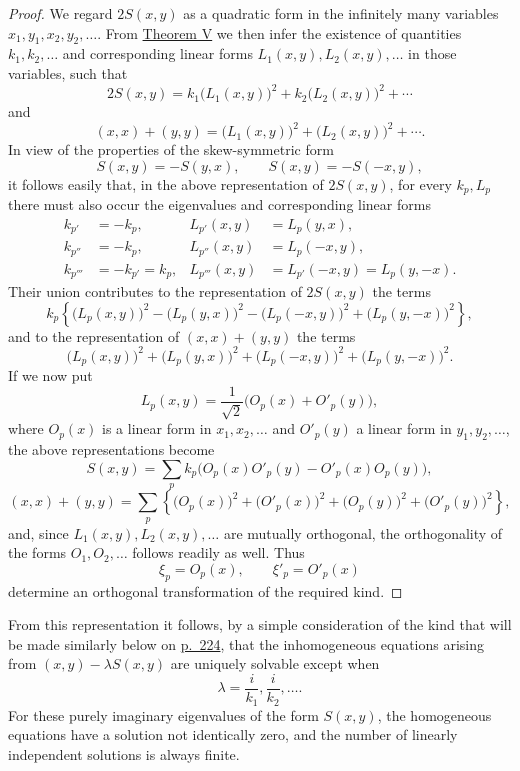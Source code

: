 \documentclass[b5paper,twoside]{article}
\newcommand{\originalpage}[1]{\phantomsection\label{origpage:#1}}
\begin{document}
\begin{proof}
We regard $2S(x,y)$ as a quadratic form in the infinitely many variables
$x_1,y_1,x_2,y_2,\ldots$. From \hyperref[thm:V]{Theorem V} we then infer the
existence of quantities $k_1,k_2,\ldots$ and corresponding linear forms
$L_1(x,y),L_2(x,y),\ldots$ in those variables, such that
\[
  2S(x,y)=k_1\bigl(L_1(x,y)\bigr)^2
          +k_2\bigl(L_2(x,y)\bigr)^2+\cdots
\]
and
\[
  (x,x)+(y,y)=\bigl(L_1(x,y)\bigr)^2
              +\bigl(L_2(x,y)\bigr)^2+\cdots.
\]
In view of the properties of the skew-symmetric form
\[
  S(x,y)=-S(y,x),
  \qquad
  S(x,y)=-S(-x,y),
\]
it follows easily that, in the above representation of $2S(x,y)$, for every
$k_p,L_p$ there must also occur the eigenvalues and corresponding linear
forms
\begin{align*}
  k_{p'}&=-k_p,
  &L_{p'}(x,y)&=L_p(y,x),\\
  k_{p''}&=-k_p,
  &L_{p''}(x,y)&=L_p(-x,y),\\
  k_{p'''}&=-k_{p'}=k_p,
  &L_{p'''}(x,y)&=L_{p'}(-x,y)=L_p(y,-x).
\end{align*}
Their union contributes to the representation of $2S(x,y)$ the terms
\[
  k_p\left\{
    \bigl(L_p(x,y)\bigr)^2-\bigl(L_p(y,x)\bigr)^2
    -\bigl(L_p(-x,y)\bigr)^2+\bigl(L_p(y,-x)\bigr)^2
  \right\},
\]
and to the representation of $(x,x)+(y,y)$ the terms
\[
  \bigl(L_p(x,y)\bigr)^2+\bigl(L_p(y,x)\bigr)^2
  +\bigl(L_p(-x,y)\bigr)^2+\bigl(L_p(y,-x)\bigr)^2.
\]
If we now put
\[
  L_p(x,y)=\frac{1}{\sqrt2}\bigl(O_p(x)+O'_p(y)\bigr),
\]
where $O_p(x)$ is a linear form in $x_1,x_2,\ldots$ and $O'_p(y)$ a linear
form in $y_1,y_2,\ldots$, the above representations become
\[
  S(x,y)=\sum_p k_p\bigl(O_p(x)O'_p(y)-O'_p(x)O_p(y)\bigr),
\]
\[
  (x,x)+(y,y)=\sum_p\left\{
    \bigl(O_p(x)\bigr)^2+\bigl(O'_p(x)\bigr)^2
    +\bigl(O_p(y)\bigr)^2+\bigl(O'_p(y)\bigr)^2
  \right\},
\]
\originalpage{218}
and, since $L_1(x,y),L_2(x,y),\ldots$ are mutually orthogonal, the
orthogonality of the forms $O_1,O_2,\ldots$ follows readily as well. Thus
\[
  \xi_p=O_p(x),\qquad \xi'_p=O'_p(x)
\]
determine an orthogonal transformation of the required kind.
\end{proof}

From this representation it follows, by a simple consideration of the kind
that will be made similarly below on \hyperref[origpage:224]{p.~224}, that
the inhomogeneous equations arising from
$(x,y)-\lambda S(x,y)$ are uniquely solvable except when
\[
  \lambda=\frac{i}{k_1},\frac{i}{k_2},\ldots.
\]
For these purely imaginary eigenvalues of the form $S(x,y)$, the homogeneous
equations have a solution not identically zero, and the number of linearly
independent solutions is always finite.
\end{document}
